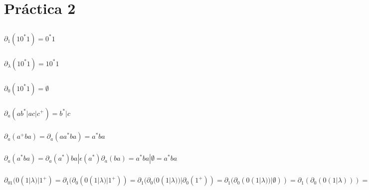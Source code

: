 \section{Práctica 2}

\setcounter{subsection}{1}
\subsection{}

\subsubsection{}
$\partial_1(10^*1) = 0^*1$

\subsubsection{}
$\partial_\lambda(10^*1) = 10^*1$

\subsubsection{}
$\partial_0(10^*1) = \emptyset$

\subsubsection{}
$\partial_a(ab^*|ac|c^+) = b^*|c$

\subsubsection{}
$\partial_a(a^+ba) = \partial_a(aa^*ba) = a^*ba$

\subsubsection{}
$\partial_a(a^*ba) = \partial_a(a^*)ba | \epsilon(a^*)\partial_a(ba) = a^*ba|\emptyset = a^*ba$

\subsubsection{}
$\partial_{01}(0(1|\lambda)|1^+) = \partial_1(\partial_0(0(1|\lambda)|1^+)) = \partial_1(\partial_0(0(1|\lambda))|\partial_0(1^+)) = \partial_1(\partial_0(0(1|\lambda))|\emptyset)) = \partial_1(\partial_0(0(1|\lambda))) = \partial_1(1|\lambda) = \lambda$

\subsection{}

